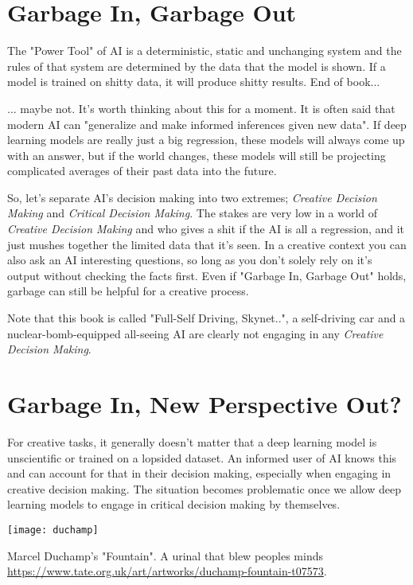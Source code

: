 \section{Garbage In, Garbage Out}

The "Power Tool" of AI is a deterministic, static and unchanging system and the rules of that system are determined by the data that the model is shown. If a model is trained on shitty data, it will produce shitty results. End of book...

... maybe not. It's worth thinking about this for a moment. It is often said that modern AI can "generalize and make informed inferences given new data". If deep learning models are really just a big regression, these models will always come up with an answer, but if the world changes, these models will still be projecting complicated averages of their past data into the future. 

So, let's separate AI's decision making into two extremes; \textit{Creative Decision Making} and \textit{Critical Decision Making}. The stakes are very low in a world of \textit{Creative Decision Making} and who gives a shit if the AI is all a regression, and it just mushes together the limited data that it's seen. In a creative context you can also ask an AI interesting questions, so long as you don't solely rely on it's output without checking the facts first. Even if "Garbage In, Garbage Out" holds, garbage can still be helpful for a creative process. 

Note that this book is called "Full-Self Driving, Skynet..", a self-driving car and a nuclear-bomb-equipped all-seeing AI are clearly not engaging in any \textit{Creative Decision Making}. 

\section{Garbage In, New Perspective Out?}

For creative tasks, it generally doesn't matter that a deep learning model is unscientific or trained on a lopsided dataset. An informed user of AI knows this and can account for that in their decision making, especially when engaging in creative decision making. The situation becomes problematic once we allow deep learning models to engage in critical decision making by themselves. 

\begin{marginfigure}[-5.5cm]
        \texttt{[image: duchamp]}
        \caption{Marcel Duchamp's "Fountain". A urinal that blew peoples minds \url{https://www.tate.org.uk/art/artworks/duchamp-fountain-t07573}.}
\end{marginfigure}

